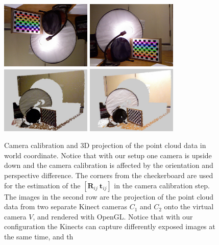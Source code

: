 \begin{figure}
\centering
\includegraphics[width=1.7in]{ch4/diagrams/corners01.jpg} 
\includegraphics[width=1.7in]{ch4/diagrams/corners02.jpg} \\
\includegraphics[width=1.7in]{ch4/diagrams/calibration_camera1.jpg} 
\includegraphics[width=1.7in]{ch4/diagrams/calibration_camera2.jpg} \\
\caption{Camera calibration and 3D projection of the point cloud data in world coordinate. Notice that with our setup one camera is upside down and the camera calibration is affected by the orientation and perspective difference. The corners from the checkerboard are used for the estimation of the $[\mathbf{R}_{ij}~\mathbf{t}_{ij}]$ in the camera calibration step. The images in the second row are the projection of the point cloud data from two separate Kinect cameras $C_{1}$ and $C_{2}$ onto the virtual camera $V$, and rendered with OpenGL. Notice that with our configuration the Kinects can capture differently exposed images at the same time, and th}
\label{fig_reproject}
\label{sec_sim_hdr_mul_kinect}
\end{figure}
